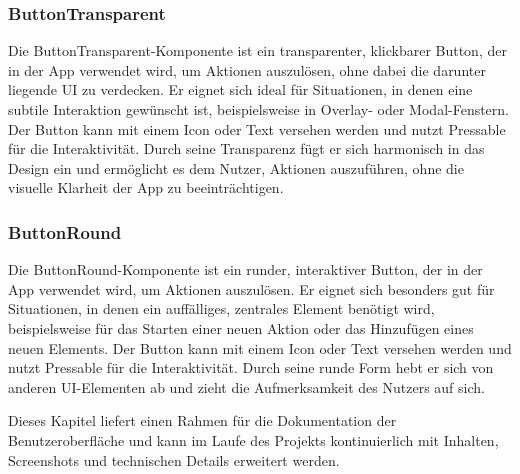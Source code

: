 \subsubsection{ButtonTransparent}
Die ButtonTransparent-Komponente ist ein transparenter, klickbarer Button, der in der App verwendet wird, um Aktionen auszulösen, ohne dabei die darunter liegende UI zu verdecken. Er eignet sich ideal für Situationen, in denen eine subtile Interaktion gewünscht ist, beispielsweise in Overlay- oder Modal-Fenstern. Der Button kann mit einem Icon oder Text versehen werden und nutzt Pressable für die Interaktivität. Durch seine Transparenz fügt er sich harmonisch in das Design ein und ermöglicht es dem Nutzer, Aktionen auszuführen, ohne die visuelle Klarheit der App zu beeinträchtigen.

\subsubsection{ButtonRound}
Die ButtonRound-Komponente ist ein runder, interaktiver Button, der in der App verwendet wird, um Aktionen auszulösen. Er eignet sich besonders gut für Situationen, in denen ein auffälliges, zentrales Element benötigt wird, beispielsweise für das Starten einer neuen Aktion oder das Hinzufügen eines neuen Elements. Der Button kann mit einem Icon oder Text versehen werden und nutzt Pressable für die Interaktivität. Durch seine runde Form hebt er sich von anderen UI-Elementen ab und zieht die Aufmerksamkeit des Nutzers auf sich.

\vspace{1em}
\noindent
Dieses Kapitel liefert einen Rahmen für die Dokumentation der Benutzeroberfläche und kann im Laufe des Projekts kontinuierlich mit Inhalten, Screenshots und technischen Details erweitert werden.

